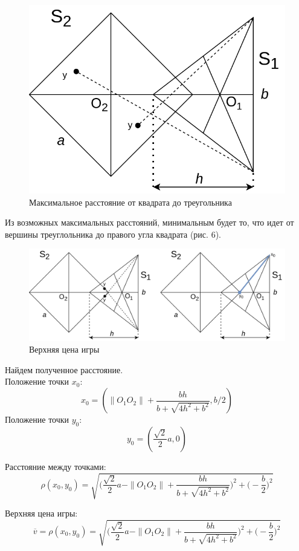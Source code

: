 \documentclass[12pt,a4paper]{article}
\begin{document}
\begin{figure}[ht]
  \centering
  \includegraphics[scale=0.4]{persuit_max.drawio.png}
  \caption{Максимальное расстояние от квадрата до треугольника}
\end{figure}

Из возможных максимальных расстояний, минимальным будет то, что идет от
вершины треуглольника до правого угла квадрата (рис. 6).

\begin{figure}[ht]
  \centering
  \includegraphics[scale=0.28]{persuit_max_min.drawio.png}
  \caption{Верхняя цена игры}
\end{figure}

Найдем полученное расстояние.\\
Положение точки $x_0$:
\[
  x_0 = (\|O_1 O_2\|+\frac{bh}{b+\sqrt{4h^2+b^2}}, b/2)
\]
Положение точки $y_0$:
\[
  y_0 = (\frac{\sqrt{2}}{2}a, 0)
\]

Расстояние между точками:
\[
  \rho(x_0, y_0) = \sqrt{
    \bigl(\frac{\sqrt{2}}{2}a - \|O_1 O_2\|+\frac{bh}{b+\sqrt{4h^2+b^2}}\bigr)^2 +
    \bigl(-\frac{b}{2}\bigr)^2
  }
\]

Верхняя цена игры:
\[
  \overline{v} = \rho(x_0, y_0) = \sqrt{
    \bigl(\frac{\sqrt{2}}{2}a - \|O_1 O_2\|+\frac{bh}{b+\sqrt{4h^2+b^2}}\bigr)^2 +
    \bigl(-\frac{b}{2}\bigr)^2
  }
\]
\end{document}
